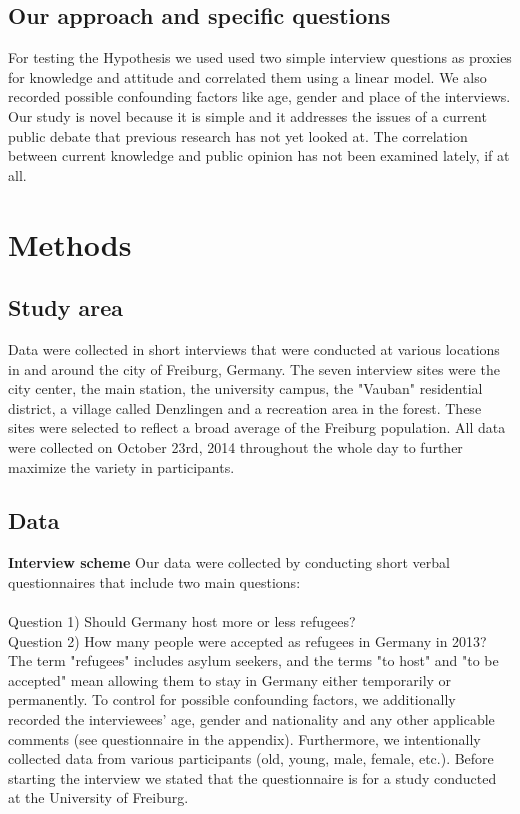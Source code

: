 \documentclass{article}
\begin{document}
\subsection{Our approach and specific questions}

For testing the Hypothesis we used used two simple interview questions as proxies for knowledge and attitude and correlated them using a linear model. We also recorded possible confounding factors like age, gender and place of the interviews.
Our study is novel because it is simple and it addresses the issues of a current public debate that previous research has not yet looked at. The correlation between current knowledge and public opinion has not been examined lately, if at all.


\section{Methods}

\subsection{Study area}
Data were collected in short interviews that were conducted at various locations in and around the city of Freiburg, Germany. The seven interview sites were the city center, the main station, the university campus, the "Vauban" residential district, a village called Denzlingen and a recreation area in the forest. These sites were selected to reflect a broad average of the Freiburg population. All data were collected on October 23rd, 2014 throughout the whole day to further maximize the variety in participants.

\subsection{Data}

\textbf{Interview scheme}
Our data were collected by conducting short verbal questionnaires that include two main questions: \\\\
Question 1) Should Germany host more or less refugees?\\
Question 2) How many people were accepted as refugees in Germany in 2013?\\

The term "refugees" includes asylum seekers, and the terms "to host" and "to be accepted" mean allowing them to stay in Germany either temporarily or permanently. To control for possible confounding factors, we additionally recorded the interviewees’ age, gender and nationality and any other applicable comments (see questionnaire in the appendix). Furthermore, we intentionally collected data from various participants (old, young, male, female, etc.). Before starting the interview we stated that the questionnaire is for a study conducted at the University of Freiburg.
\end{document}
